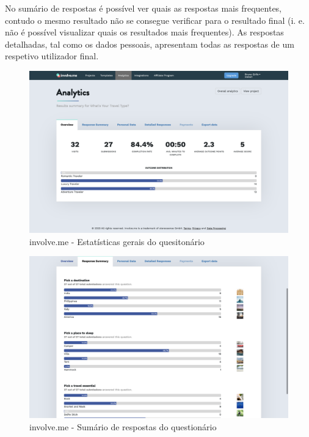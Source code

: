 No sumário de respostas é possível ver quais as respostas mais frequentes, contudo o mesmo resultado não se consegue verificar para o resultado final (i. e. não é possível visualizar quais os resultados mais frequentes). As respostas detalhadas, tal como os dados pessoais, apresentam todas as respostas de um respetivo utilizador final. 

\newpage

\begin{figure}[ht!]
	\begin{center}
		\includegraphics[width=1\textwidth]{img/ivme/overall1}
		\caption{involve.me - Estatísticas gerais do quesitonário}
		\label{fig:ivme-overall1}
	\end{center}
\end{figure}

\begin{figure}[ht!]
	\begin{center}
		\includegraphics[width=1\textwidth]{img/ivme/results1}
		\caption{involve.me - Sumário de respostas do questionário}
		\label{fig:ivme-results1}
	\end{center}
\end{figure}



